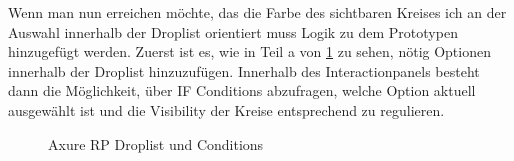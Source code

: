Wenn man nun erreichen möchte, das die Farbe des sichtbaren Kreises ich an der Auswahl innerhalb der Droplist orientiert muss Logik zu dem Prototypen hinzugefügt werden.
Zuerst ist es, wie in Teil a von \cref{fig:Droplist} zu sehen, nötig Optionen innerhalb der Droplist hinzuzufügen.
Innerhalb des Interactionpanels besteht dann die Möglichkeit, über IF Conditions abzufragen, welche Option aktuell ausgewählt ist und die Visibility der Kreise entsprechend zu regulieren.

\begin{figure}%
\centering
{}%
\qquad
{}%

\caption{Axure RP Droplist und Conditions}%
\label{fig:Droplist}
\end{figure}

